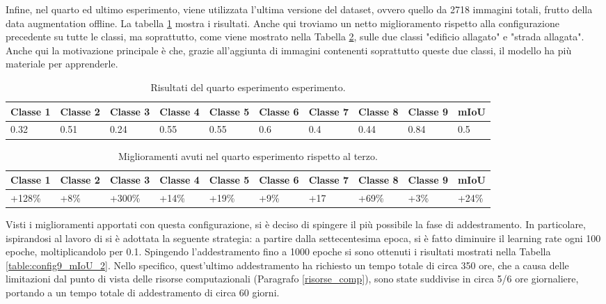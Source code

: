 Infine, nel quarto ed ultimo esperimento, viene utilizzata l'ultima versione del dataset, ovvero quello da 2718 immagini totali, frutto della data augmentation offline.
La tabella \ref{table:config9_mIoU_1} mostra i risultati. Anche qui troviamo un netto miglioramento rispetto alla configurazione precedente su tutte le classi, ma soprattutto, come viene mostrato nella Tabella \ref{table:config8_vs_config9}, sulle due classi "edificio allagato" e "strada allagata".
Anche qui la motivazione principale è che, grazie all'aggiunta di immagini contenenti soprattutto queste due classi, il modello ha più materiale per apprenderle.

\begin{table}[h!]
\hspace{-0.1in}
\begin{tabular}{||p{1cm} p{1cm} p{1cm} p{1cm} p{1cm} p{1cm} p{1cm} p{1cm} p{1cm} | p{1cm}||}
 \hline
    Classe 1 & Classe 2 & Classe 3 & Classe 4 & Classe 5 & Classe 6 & Classe 7 & Classe 8 & Classe 9 & mIoU \\ [0.5ex]
 \hline
0.32 & 0.51 & 0.24 & 0.55 &  0.55 & 0.6 & 0.4 & 0.44 & 0.84 & 0.5 \\ [1ex] 
 \hline
\end{tabular}
\caption{Risultati del quarto esperimento esperimento.}
\label{table:config9_mIoU_1}
\end{table}

\begin{table}[h!]
\hspace{-0.3in}
\begin{tabular}{||p{1.5cm} p{1cm} p{1.5cm} p{1cm} p{1cm} p{1cm} p{1cm} p{1cm} p{1cm} | p{1.2cm}||}
 \hline
    Classe 1 & Classe 2 & Classe 3 & Classe 4 & Classe 5 & Classe 6 & Classe 7 & Classe 8 & Classe 9 & mIoU \\ [0.5ex]
 \hline
+128\% & +8\% & +300\% & +14\% & +19\% & +9\% & +17 & +69\% & +3\% & +24\% \\ [1ex] 
 \hline
\end{tabular}
\caption{Miglioramenti avuti nel quarto esperimento rispetto al terzo.}
\label{table:config8_vs_config9}
\end{table}

Visti i miglioramenti apportati con questa configurazione, si è deciso di spingere il più possibile la fase di addestramento. In particolare, ispirandosi al lavoro di \cite{deeplabv1, deeplabv2, deeplabv3} si è adottata la seguente strategia: a partire dalla settecentesima epoca, si è fatto diminuire il learning rate ogni 100 epoche, moltiplicandolo per 0.1. Spingendo l'addestramento fino a 1000 epoche si sono ottenuti i risultati mostrati nella Tabella \ref{table:config9_mIoU_2}. Nello specifico, quest'ultimo addestramento ha richiesto un tempo totale di circa 350 ore, che a causa delle limitazioni dal punto di vista delle risorse computazionali (Paragrafo \ref{risorse_comp}), sono state suddivise in circa 5/6 ore giornaliere, portando a un tempo totale di addestramento di circa 60 giorni.


